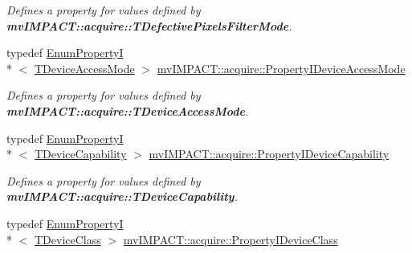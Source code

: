 \begin{DoxyCompactItemize}
\begin{DoxyCompactList}\small\item\em Defines a property for values defined by {\bfseries mv\+I\+M\+P\+A\+C\+T\+::acquire\+::\+T\+Defective\+Pixels\+Filter\+Mode}. \end{DoxyCompactList}\item 
\hypertarget{group___common_interface_gac860ed08eaeb7ccb3cbc879a22ca43c9}{typedef \hyperlink{classmv_i_m_p_a_c_t_1_1acquire_1_1_enum_property_i}{Enum\+Property\+I}\\*
$<$ \hyperlink{group___common_interface_ga9b3c160c06d68e5840aba2e4685389b8}{T\+Device\+Access\+Mode} $>$ \hyperlink{group___common_interface_gac860ed08eaeb7ccb3cbc879a22ca43c9}{mv\+I\+M\+P\+A\+C\+T\+::acquire\+::\+Property\+I\+Device\+Access\+Mode}}\label{group___common_interface_gac860ed08eaeb7ccb3cbc879a22ca43c9}

\begin{DoxyCompactList}\small\item\em Defines a property for values defined by {\bfseries mv\+I\+M\+P\+A\+C\+T\+::acquire\+::\+T\+Device\+Access\+Mode}. \end{DoxyCompactList}\item 
\hypertarget{group___common_interface_ga4a143abc5e951b2d4a22a0a835d4c5d1}{typedef \hyperlink{classmv_i_m_p_a_c_t_1_1acquire_1_1_enum_property_i}{Enum\+Property\+I}\\*
$<$ \hyperlink{group___common_interface_gab025951bf5eb52c67790e7ecd197b76e}{T\+Device\+Capability} $>$ \hyperlink{group___common_interface_ga4a143abc5e951b2d4a22a0a835d4c5d1}{mv\+I\+M\+P\+A\+C\+T\+::acquire\+::\+Property\+I\+Device\+Capability}}\label{group___common_interface_ga4a143abc5e951b2d4a22a0a835d4c5d1}

\begin{DoxyCompactList}\small\item\em Defines a property for values defined by {\bfseries mv\+I\+M\+P\+A\+C\+T\+::acquire\+::\+T\+Device\+Capability}. \end{DoxyCompactList}\item 
\hypertarget{group___common_interface_gaa711dff24b159d7f25686f736db21a2f}{typedef \hyperlink{classmv_i_m_p_a_c_t_1_1acquire_1_1_enum_property_i}{Enum\+Property\+I}\\*
$<$ \hyperlink{group___common_interface_ga9f8cbab52f6b995214e7ac4bc56bc11a}{T\+Device\+Class} $>$ \hyperlink{group___common_interface_gaa711dff24b159d7f25686f736db21a2f}{mv\+I\+M\+P\+A\+C\+T\+::acquire\+::\+Property\+I\+Device\+Class}}\label{group___common_interface_gaa711dff24b159d7f25686f736db21a2f}


\end{DoxyCompactItemize}
